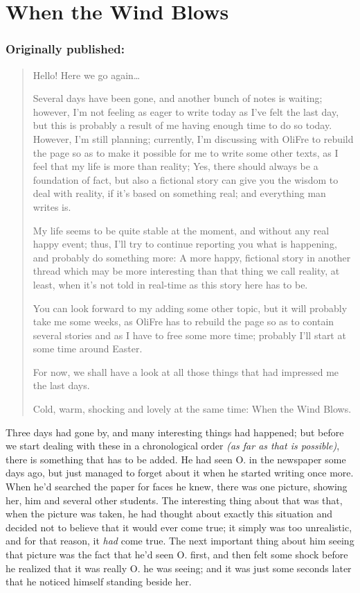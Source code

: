 \chapter{When the Wind Blows}
\label{cha:when-wind-blows}
\subsection*{Originally published: }
\begin{quote}
Hello! Here we go again\ldots

Several days have been gone, and another bunch of notes is waiting; however, I'm not feeling as eager to write today as I've felt the last day, but this is probably a result of me having enough time to do so today. However, I'm still planning; currently, I'm discussing with OliFre to rebuild the page so as to make it possible for me to write some other texts, as I feel that my life is more than reality; Yes, there should always be a foundation of fact, but also a fictional story can give you the wisdom to deal with reality, if it's based on something real; and everything man writes is.

My life seems to be quite stable at the moment, and without any real happy event; thus, I'll try to continue reporting you what is happening, and probably do something more: A more happy, fictional story in another thread which may be more interesting than that thing we call reality, at least, when it's not told in real-time as this story here has to be.

You can look forward to my adding some other topic, but it will probably take me some weeks, as OliFre has to rebuild the page so as to contain several stories and as I have to free some more time; probably I'll start at some time around Easter.

For now, we shall have a look at all those things that had impressed me the last days.

Cold, warm, shocking and lovely at the same time: When the Wind Blows.
\end{quote}

Three days had gone by, and many interesting things had happened; but before we start dealing with these in a chronological order \emph{(as far as that is possible)}, there is something that has to be added. 
He had seen O. in the newspaper some days ago, but just managed to forget about it when he started writing once more. When he'd searched the paper for faces he knew, there was one picture, showing her, him and several other students. The interesting thing about that was that, when the picture was taken, he had thought about exactly this situation and decided not to believe that it would ever come true; it simply was too unrealistic, and for that reason, it \emph{had} come true. The next important thing about him seeing that picture was the fact that he'd seen O. first, and then felt some shock before he realized that it was really O. he was seeing; and it was just some seconds later that he noticed himself standing beside her.

